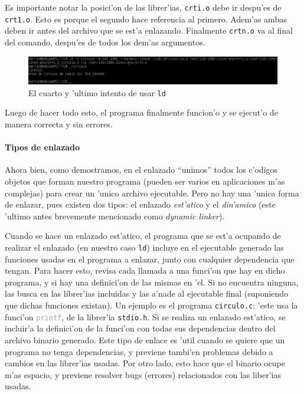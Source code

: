 \documentclass[11pt]{article}
\newcommand{\subsubsubsection}[1]{\paragraph{#1}\mbox{}}
\begin{document}
		Es importante notar la posici'on de las librer'ias, \texttt{crti.o} debe ir despu'es de \texttt{crt1.o}. Esto es porque el segundo hace referencia al primero. Adem'as ambas deben ir antes del archivo que se est'a enlazando. Finalmente \texttt{crtn.o} va al final del comando, despu'es de todos los dem'as argumentos.
		
		\begin{figure}[H]
			\centering
			\includegraphics[width=.9\linewidth]{Images/Seccion 1/S1 parte nueve.PNG}
			\caption{El cuarto y 'ultimo intento de usar \texttt{ld}}
			\label{fig:fourth-ld-attempt}
		\end{figure}
		
		Luego de hacer todo esto, el programa finalmente funcion'o y se ejecut'o de manera correcta y sin errores. 


		\subsubsubsection{Tipos de enlazado}

		Ahora bien, como demostramos, en el enlazado ``unimos'' todos los c'odigos objetos que forman nuestro programa (pueden ser varios en aplicaciones m'as complejas) para crear un 'unico archivo ejecutable. Pero no hay una 'unica forma de enlazar, pues existen dos tipos: el enlazado \textit{est'atico} y el \textit{din'amico} (este 'ultimo antes brevemente mencionado como \textit{dynamic linker}).
		
		Cuando se hace un enlazado est'atico, el programa que se est'a ocupando de realizar el enlazado (en nuestro caso \texttt{ld}) incluye en el ejecutable generado las funciones usadas en el programa a enlazar, junto con cualquier dependencia que tengan. Para hacer esto, revisa cada llamada a una funci'on que hay en dicho programa, y si hay una definici'on de las mismas en 'el. Si no encuentra ninguna, las busca en las librer'ias incluidas y las a'nade al ejecutable final (suponiendo que dichas funciones existan). Un ejemplo es el programa \texttt{circulo.c}: 'este usa la funci'on \texttt{\textcolor{darkgray}{printf}}, de la librer'ia \texttt{\textcolor{orange-desert-vim}{stdio.h}}. Si se realiza un enlazado est'atico, se incluir'a la definici'on de la funci'on con todas sus dependencias dentro del archivo binario generado. Este tipo de enlace es 'util cuando se quiere que un programa no tenga dependencias, y previene tambi'en problemas debido a cambios en las librer'ias usadas. Por otro lado, esto hace que el binario ocupe m'as espacio, y previene resolver bugs (errores) relacionados con las liber'ias usadas.
\end{document}
